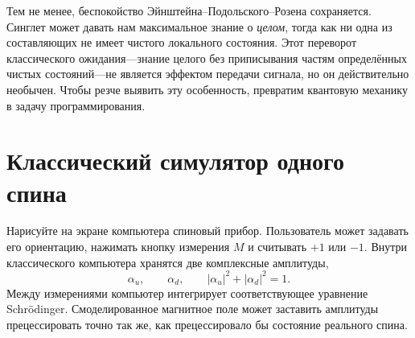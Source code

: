 \begin{classroomqa}
\end{classroomqa}

\begin{classroomqa}
\end{classroomqa}

Тем не менее, беспокойство Эйнштейна--Подольского--Розена сохраняется. Синглет может давать нам максимальное знание о \emph{целом}, тогда как ни одна из составляющих не имеет чистого локального состояния. Этот переворот классического ожидания---знание целого без приписывания частям определённых чистых состояний---не является эффектом передачи сигнала, но он действительно необычен. Чтобы резче выявить эту особенность, превратим квантовую механику в задачу программирования.

\section{Классический симулятор одного спина}

Нарисуйте на экране компьютера спиновый прибор. Пользователь может задавать его ориентацию, нажимать кнопку измерения \(M\) и считывать \(+1\) или \(-1\). Внутри классического компьютера хранятся две комплексные амплитуды,
\begin{equation}
\alpha_u,\qquad \alpha_d,
\qquad
|\alpha_u|^2+|\alpha_d|^2=1.
\label{eq:l8-one-spin-amplitudes}
\end{equation}
Между измерениями компьютер интегрирует соответствующее уравнение Schr\"odinger. Смоделированное магнитное поле может заставить амплитуды прецессировать точно так же, как прецессировало бы состояние реального спина.

